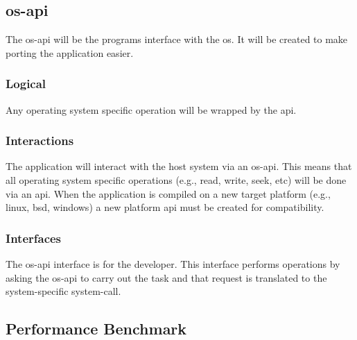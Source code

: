 \begin{enmerate}
\begin{itemzie}
\subsection{\gls{os-api}}
\label{os-agnostic-api}

The \gls{os-api} will be the programs interface with the \gls{os}.
It will be created to make porting the application easier. 

\subsubsection{Logical}

Any operating system specific operation will be wrapped by the \gls{api}.

\subsubsection{Interactions}

The application will interact with the host system via an \gls{os-api}.
This means that all operating system specific operations (e.g., read, write, seek, etc) will be done via an \gls{api}.
When the application is compiled on a new target platform (e.g., \gls{linux}, \gls{bsd}, \gls{windows}) a new platform \gls{api} must be created for compatibility.

\subsubsection{Interfaces}

The \gls{os-api} interface is for the developer.
This interface performs operations by asking the \gls{os-api} to carry out the task and that request is translated to the system-specific system-call. 

\subsection{Performance Benchmark}
\label{performance-benchmark}


\end{itemzie}
\end{enmerate}
